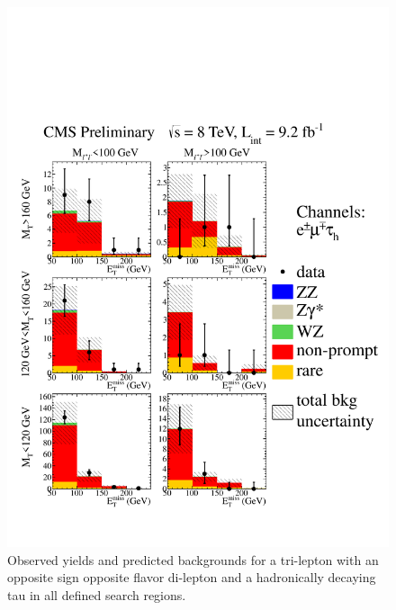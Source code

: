 \begin{figure}[htp]
\begin{center}
\includegraphics[width=1.0\textwidth]{plots/3lfinal/ossf0tau1_C2.pdf}
\caption{Observed yields and predicted backgrounds for a tri-lepton with an opposite sign opposite flavor di-lepton 
and a hadronically decaying tau in all defined search regions.}
\label{fig:OSOFtau1}
\end{center}
\end{figure}
